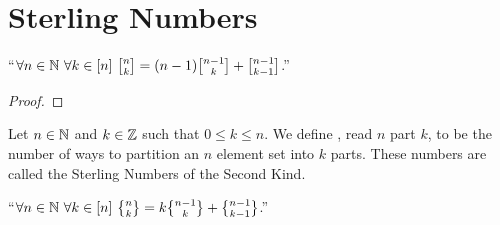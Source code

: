     \section{Sterling Numbers}
        \begin{definition}
        \end{definition}
        \begin{theorem}
            ``$\forall n \in \set{N} \ \forall k \in [n] \ \npermk{n}{k} = (n - 1) \npermk{n - 1}{k} + \npermk{n - 1}{k - 1}$.''
        \end{theorem}
        \begin{proof}
        \end{proof}
        \begin{definition}
            Let $n \in \mathbb{N}$ and $k \in \mathbb{Z}$ such that $0 \le k \le n$. We define
            , read $n$ part $k$, to be the number of ways to partition
            an $n$ element set into $k$ parts. These numbers are called the Sterling Numbers
            of the Second Kind.
        \end{definition}
        \begin{theorem}
            ``$\forall n \in \set{N} \ \forall k \in [n] \ \npartk{n}{k} = k \npartk{n - 1}{k} + \npartk{n - 1}{k - 1}$.''
        \end{theorem}
